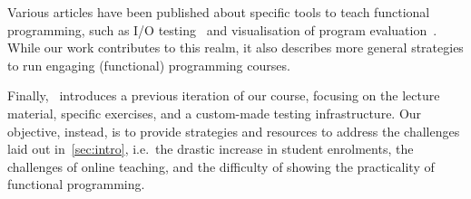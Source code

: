 Various articles have been published about
specific tools to teach functional programming,
such as I/O testing~\cite{iotest2}
and visualisation of program evaluation~\cite{steppingocaml}.
While our work contributes to this realm,
it also describes more general strategies
to run engaging (functional) programming courses.

Finally,~\cite{next_1100}
introduces a previous iteration of our course,
focusing on the lecture material,
specific exercises, and a custom-made testing infrastructure.
Our objective, instead, is to provide strategies and resources to address
the challenges laid out in~\cref{sec:intro},
i.e.\ the drastic increase in student enrolments,
the challenges of online teaching,
and the difficulty of showing the practicality of functional programming.
